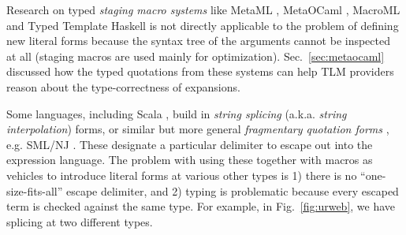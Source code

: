 \documentclass[acmsmall]{acmart}
\begin{document}
Research on typed \emph{staging macro systems} \cite{DBLP:conf/popl/DaviesP96} like MetaML \cite{Sheard:1999:UMS}, MetaOCaml \cite{DBLP:conf/flops/Kiselyov14}, MacroML \cite{ganz2001macros,DBLP:conf/gpce/TahaJ03} and Typed Template Haskell \cite{tth} is not directly applicable to the problem of defining new literal forms because the syntax tree of the arguments cannot be inspected at all (staging macros are used mainly for optimization). Sec.~\ref{sec:metaocaml} discussed how the typed quotations from these systems can help TLM providers reason about the type-correctness of expansions.%


  Some languages, including Scala \cite{odersky2008programming}, build in \emph{string splicing} (a.k.a. \emph{string interpolation}) forms, or similar but more general \emph{fragmentary quotation forms} \cite{conf/icfp/Slind91}, e.g. SML/NJ \cite{SML/Quote}. These designate a particular delimiter to escape out into the expression language. The problem with using these together with macros as vehicles to introduce literal forms at various other types is 1) there is no ``one-size-fits-all'' escape delimiter, and 2) typing is problematic because every escaped term is checked against the same type. For example, in Fig.~\ref{fig:urweb}, we have splicing at two different types. %
\end{document}
